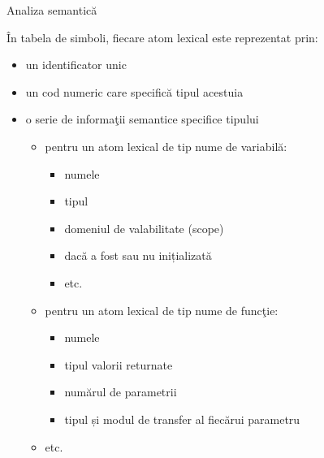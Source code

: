 \documentclass[pdf]{beamer}
\begin{document}
\begin{frame}{Analiza semantică}

În tabela de simboli, fiecare atom lexical este reprezentat prin:

\begin{itemize}
\item
un identificator unic
\item
un cod numeric care specifică tipul acestuia
\item
o serie de informaţii semantice specifice tipului
\begin{itemize}
\item 
pentru un atom lexical de tip nume de variabilă:
\begin{itemize}
\item
numele
\item
tipul
\item
domeniul de valabilitate (scope)
\item
dacă a fost sau nu inițializată
\item
etc.
\end{itemize}

\item
pentru un atom lexical de tip nume de funcţie:
\begin{itemize}
\item
numele
\item
tipul valorii returnate
\item
numărul de parametrii
\item
tipul și modul de transfer al fiecărui parametru
\end{itemize}
\item
etc.
\end{itemize}
\end{itemize}
\end{frame}
\end{document}
